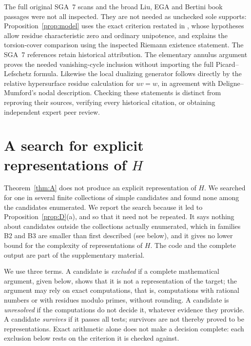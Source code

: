 \documentclass[11pt]{amsart}
\theoremstyle{definition}
\theoremstyle{remark}
\numberwithin{equation}{section}
\begin{document}
The full original SGA~7 scans and the broad Liu, EGA and Bertini book passages were not all inspected. They are not needed as unchecked sole supports: Proposition~\ref{prop:model} uses the exact criterion restated in \citet[Theorem~4.1]{SilverbergZarhin2001}, whose hypotheses allow residue characteristic zero and ordinary unipotence, and explains the torsion-cover comparison using the inspected Riemann existence statement. The SGA~7 references retain historical attribution. The elementary annulus argument proves the needed vanishing-cycle inclusion without importing the full Picard--Lefschetz formula. Likewise the local dualizing generator follows directly by the relative hypersurface residue calculation for $uv=w$, in agreement with Deligne--Mumford's nodal description. Checking these statements is distinct from reproving their sources, verifying every historical citation, or obtaining independent expert peer review.

\section{A search for explicit representations of \texorpdfstring{$H$}{H}}\label{app:search}

Theorem~\ref{thm:A} does not produce an explicit representation of $H$. We searched for one in several finite collections of simple candidates and found none among the candidates enumerated. We report the search because it led to Proposition~\ref{prop:D}(a), and so that it need not be repeated. It says nothing about candidates outside the collections actually enumerated, which in families B2 and B3 are smaller than first described (see below), and it gives no lower bound for the complexity of representations of $H$. The code and the complete output are part of the supplementary material.

We use three terms. A candidate is \emph{excluded} if a complete mathematical argument, given below, shows that it is not a representation of the target; the argument may rely on exact computations, that is, computations with rational numbers or with residues modulo primes, without rounding. A candidate is \emph{unresolved} if the computations do not decide it, whatever evidence they provide. A candidate \emph{survives} if it passes all tests; survivors are not thereby proved to be representations. Exact arithmetic alone does not make a decision complete: each exclusion below rests on the criterion it is checked against.
\end{document}
